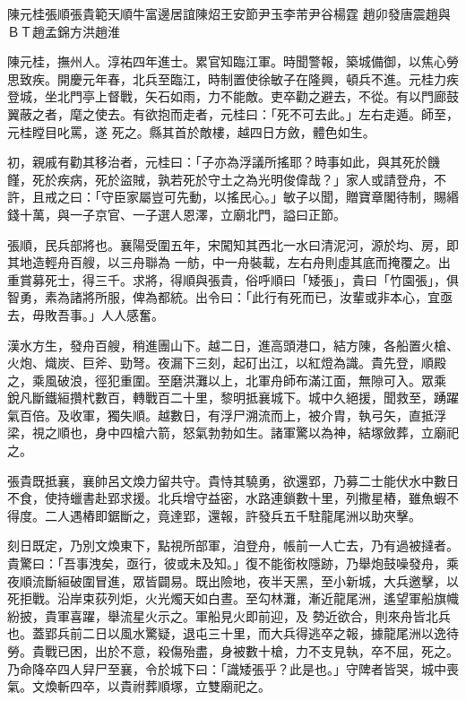 
\begin{pinyinscope}

 陳元桂張順張貴範天順牛富邊居誼陳炤王安節尹玉李芾尹谷楊霆
 趙卯發唐震趙與ＢＴ趙孟錦方洪趙淮



 陳元桂，撫州人。淳祐四年進士。累官知臨江軍。時聞警報，築城備御，以焦心勞思致疾。開慶元年春，北兵至臨江，時制置使徐敏子在隆興，頓兵不進。元桂力疾登城，坐北門亭上督戰，矢石如雨，力不能敵。吏卒勸之避去，不從。有以門廊鼓翼蔽之者，麾之使去。有欲抱而走者，元桂曰：「死不可去此。」左右走遁。師至，元桂瞠目叱罵，遂
 死之。縣其首於敵樓，越四日方斂，體色如生。



 初，親戚有勸其移治者，元桂曰：「子亦為浮議所搖耶？時事如此，與其死於饑饉，死於疾病，死於盜賊，孰若死於守土之為光明俊偉哉？」家人或請登舟，不許，且戒之曰：「守臣家屬豈可先動，以搖民心。」敏子以聞，贈寶章閣待制，賜緡錢十萬，與一子京官、一子選人恩澤，立廟北門，謚曰正節。



 張順，民兵部將也。襄陽受圍五年，宋闖知其西北一水曰清泥河，源於均、房，即其地造輕舟百艘，以三舟聯為
 一舫，中一舟裝載，左右舟則虛其底而掩覆之。出重賞募死士，得三千。求將，得順與張貴，俗呼順曰「矮張」，貴曰「竹園張」，俱智勇，素為諸將所服，俾為都統。出令曰：「此行有死而已，汝輩或非本心，宜亟去，毋敗吾事。」人人感奮。



 漢水方生，發舟百艘，稍進團山下。越二日，進高頭港口，結方陳，各船置火槍、火炮、熾炭、巨斧、勁弩。夜漏下三刻，起矴出江，以紅燈為識。貴先登，順殿之，乘風破浪，徑犯重圍。至磨洪灘以上，北軍舟師布滿江面，無隙可入。眾乘
 銳凡斷鐵絙攢杙數百，轉戰百二十里，黎明抵襄城下。城中久絕援，聞救至，踴躍氣百倍。及收軍，獨失順。越數日，有浮尸溯流而上，被介胄，執弓矢，直抵浮梁，視之順也，身中四槍六箭，怒氣勃勃如生。諸軍驚以為神，結塚斂葬，立廟祀之。



 張貴既抵襄，襄帥呂文煥力留共守。貴恃其驍勇，欲還郢，乃募二士能伏水中數日不食，使持蠟書赴郢求援。北兵增守益密，水路連鎖數十里，列撒星樁，雖魚蝦不
 得度。二人遇樁即鋸斷之，竟達郢，還報，許發兵五千駐龍尾洲以助夾擊。



 刻日既定，乃別文煥東下，點視所部軍，洎登舟，帳前一人亡去，乃有過被撻者。貴驚曰：「吾事洩矣，亟行，彼或未及知。」復不能銜枚隱跡，乃舉炮鼓噪發舟，乘夜順流斷絙破圍冒進，眾皆闢易。既出險地，夜半天黑，至小新城，大兵邀擊，以死拒戰。沿岸束荻列炬，火光燭天如白晝。至勾林灘，漸近龍尾洲，遙望軍船旗幟紛披，貴軍喜躍，舉流星火示之。軍船見火即前迎，及
 勢近欲合，則來舟皆北兵也。蓋郢兵前二日以風水驚疑，退屯三十里，而大兵得逃卒之報，據龍尾洲以逸待勞。貴戰已困，出於不意，殺傷殆盡，身被數十槍，力不支見執，卒不屈，死之。乃命降卒四人舁尸至襄，令於城下曰：「識矮張乎？此是也。」守陴者皆哭，城中喪氣。文煥斬四卒，以貴祔葬順塚，立雙廟祀之。




\end{pinyinscope}
